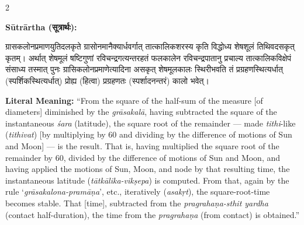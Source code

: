 \documentclass[11pt,a4paper]{article}
\newcommand{\dev}[1]{{\devanagarifont #1}}
\newenvironment{sanskritverse}{%
  \begin{center}\begin{minipage}{0.95\textwidth}
  \setlength{\leftskip}{1em}
  \setlength{\rightskip}{1em}
  \dev
}{\end{minipage}\end{center}}
\begin{document}
\begin{paracol}{2}

\noindent\textbf{Sūtrārtha (\dev{सूत्रार्थः}):}
\begin{sanskritverse}
ग्रासकलोनप्रमाणयुतिदलकृते ग्रासोनमानैक्यार्धवर्गात् तात्कालिकशरस्य कृति विद्धोध्य
शेषशूलं तिथिवदसकृत् कृतम्। अर्थात् शेषमूलं षष्टिगुणां रविचन्द्रगत्यन्तरहतं फलकालेन
रविचन्द्रपातानु प्रचाल्य तात्कालिकविक्षेपं संसाध्य तस्मात् पुनः ग्रासिकलोनप्रमाणेत्यादिना
असकृत् शेषमूलकालः स्थिरीभवति तं प्रग्रहणस्थित्यर्धात् (स्पर्शिकस्थित्यर्धात्) प्रोह्य
(हित्वा) प्रग्रहणतः (स्पर्शादनन्तरं) कालो भवेत्।
\end{sanskritverse}

\switchcolumn

\textbf{Literal Meaning:} ``From the square of the half-sum of the measure [of diameters] diminished by the \textit{grāsakalā}, having subtracted the square of the instantaneous \textit{śara} (latitude), the square root of the remainder --- made \textit{tithi}-like (\textit{tithivat}) [by multiplying by 60 and dividing by the difference of motions of Sun and Moon] --- is the result. That is, having multiplied the square root of the remainder by 60, divided by the difference of motions of Sun and Moon, and having applied the motions of Sun, Moon, and node by that resulting time, the instantaneous latitude (\textit{tātkālika-vikṣepa}) is computed. From that, again by the rule `\textit{grāsakalona-pramāṇa}', etc., iteratively (\textit{asakṛt}), the square-root-time becomes stable. That [time], subtracted from the \textit{pragrahaṇa-sthit yardha} (contact half-duration), the time from the \textit{pragrahaṇa} (from contact) is obtained.''

\end{paracol}

\vspace{0.5em}
\end{document}
